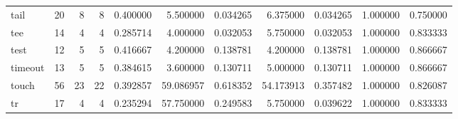 \begin{longtable}{lrrrrrrrrrr}
tail      &                                      20 &                  8 &                                 8 &                                   0.400000 &                               5.500000 &                                     0.034265 &                          6.375000 &                                0.034265 &                           1.000000 &                                           0.750000 \\
tee       &                                      14 &                  4 &                                 4 &                                   0.285714 &                               4.000000 &                                     0.032053 &                          5.750000 &                                0.032053 &                           1.000000 &                                           0.833333 \\
test      &                                      12 &                  5 &                                 5 &                                   0.416667 &                               4.200000 &                                     0.138781 &                          4.200000 &                                0.138781 &                           1.000000 &                                           0.866667 \\
timeout   &                                      13 &                  5 &                                 5 &                                   0.384615 &                               3.600000 &                                     0.130711 &                          5.000000 &                                0.130711 &                           1.000000 &                                           0.866667 \\
touch     &                                      56 &                 23 &                                22 &                                   0.392857 &                              59.086957 &                                     0.618352 &                         54.173913 &                                0.357482 &                           1.000000 &                                           0.826087 \\
tr        &                                      17 &                  4 &                                 4 &                                   0.235294 &                              57.750000 &                                     0.249583 &                          5.750000 &                                0.039622 &                           1.000000 &                                           0.833333 \\

\end{longtable}

